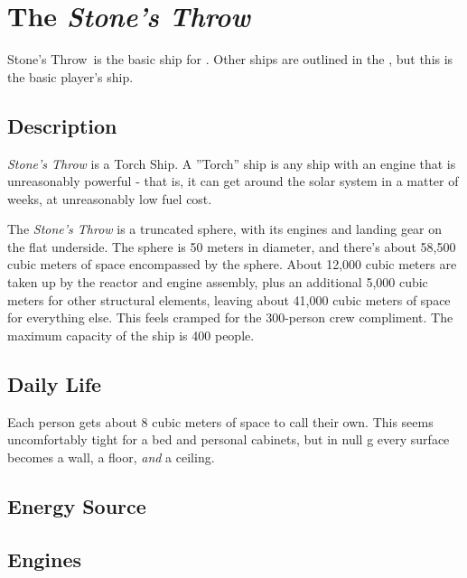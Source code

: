 \newcommand{\shipname}{Stone's Throw}

\section{The \textit{\shipname}}
\shipname\, is the basic ship for \getTitleShort . Other ships are outlined in the \shipBookTitle , but this is the basic player's ship.

\subsection{Description}
\par
\textit{Stone's Throw} is a Torch Ship. A ''Torch'' ship is any ship with an engine that is unreasonably powerful - that is, it can get around the solar system in a matter of weeks, at unreasonably low fuel cost.

\par
The \textit{Stone's Throw} is a truncated sphere, with its engines and landing gear on the flat underside. The sphere is 50 meters in diameter, and there's about 58,500 cubic meters of space encompassed by the sphere. About 12,000 cubic meters are taken up by the reactor and engine assembly, plus an additional 5,000 cubic meters for other structural elements, leaving about 41,000 cubic meters of space for everything else. This feels cramped for the 300-person crew compliment. The maximum capacity of the ship is 400 people.

\subsection{Daily Life}
\par
Each person gets about 8 cubic meters of space to call their own. This seems uncomfortably tight for a bed and personal cabinets, but in null g every surface becomes a wall, a floor, \textit{and} a ceiling.

\subsection{Energy Source}

\subsection{Engines}

